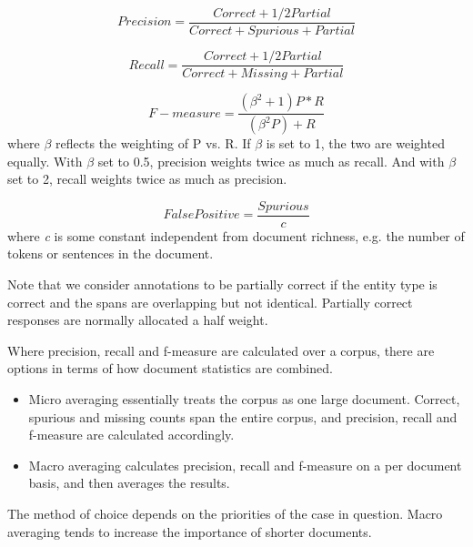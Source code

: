 \begin{equation}
 Precision = \frac{Correct + 1/2 Partial}{Correct + Spurious + Partial}
\end{equation}

\begin{equation}
 Recall = \frac{Correct + 1/2 Partial}{Correct + Missing + Partial}
\end{equation}

\begin{equation}
F-measure = \frac{(\beta^2 + 1) P * R}{(\beta^2P) + R}
\end{equation}
where $\beta$ reflects the weighting of P vs. R. If $\beta$ is set to 1, the
two are weighted equally. With $\beta$ set to 0.5, precision weights twice
as much as recall. And with $\beta$ set to 2, recall weights twice as much
as precision.

\begin{equation}
False Positive = \frac{Spurious}{c}
\end{equation}
where \textit{c} is some constant independent from document
richness, e.g. the number of tokens or sentences in the document.

Note that we consider annotations to be partially correct if the
entity type is correct and the spans are overlapping but not
identical. Partially correct responses are normally allocated a half
weight.


Where precision, recall and f-measure are calculated over a corpus, there are
options in terms of how document statistics are combined.

\begin{itemize}
  \item Micro averaging essentially treats the corpus as one large document.
  Correct, spurious and missing counts span the entire corpus, and precision,
  recall and f-measure are calculated accordingly.
  \item Macro averaging calculates precision, recall and f-measure on a per
  document basis, and then averages the results.
\end{itemize}

The method of choice depends on the priorities of the case in question. Macro
averaging tends to increase the importance of shorter documents.

